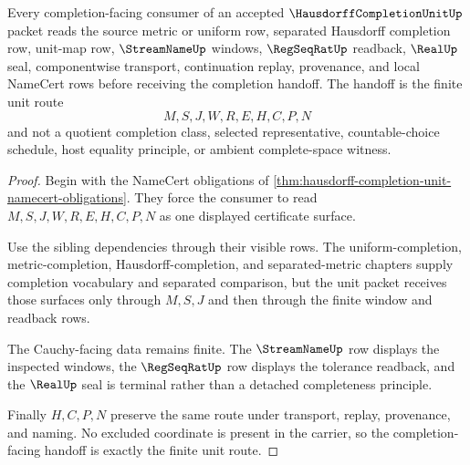 \begin{theorem}
\label{thm:hausdorff-completion-unit-cauchy-handoff}
Every completion-facing consumer of an accepted $\HausdorffCompletionUnitUp$ packet reads the source metric or uniform row, separated Hausdorff completion row, unit-map row, $\StreamNameUp$ windows, $\RegSeqRatUp$ readback, $\RealUp$ seal, componentwise transport, continuation replay, provenance, and local NameCert rows before receiving the completion handoff. The handoff is the finite unit route
$$
M,S,J,W,R,E,H,C,P,N
$$
and not a quotient completion class, selected representative, countable-choice schedule, host equality principle, or ambient complete-space witness.
\end{theorem}
\begin{proof}
Begin with the NameCert obligations of \autoref{thm:hausdorff-completion-unit-namecert-obligations}. They force the consumer to read $M,S,J,W,R,E,H,C,P,N$ as one displayed certificate surface.

Use the sibling dependencies through their visible rows. The uniform-completion, metric-completion, Hausdorff-completion, and separated-metric chapters supply completion vocabulary and separated comparison, but the unit packet receives those surfaces only through $M,S,J$ and then through the finite window and readback rows.

The Cauchy-facing data remains finite. The $\StreamNameUp$ row displays the inspected windows, the $\RegSeqRatUp$ row displays the tolerance readback, and the $\RealUp$ seal is terminal rather than a detached completeness principle.

Finally $H,C,P,N$ preserve the same route under transport, replay, provenance, and naming. No excluded coordinate is present in the carrier, so the completion-facing handoff is exactly the finite unit route.
\end{proof}



